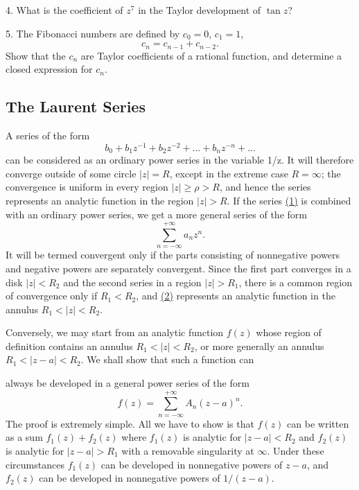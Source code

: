 4. What is the coefficient of $z^{7}$ in the Taylor development of $\tan z$?

5. The Fibonacci numbers are defined by $c_{0}=0$, $c_{1}=1$,
\begin{equation*}
c _ {n} = c _ {n - 1} + c _ {n - 2}.
\end{equation*}
Show that the $c_{n}$ are Taylor coefficients of a rational function, and determine a closed expression for $c_{n}$.

\setcounter{section}{1}\setcounter{subsection}{2}\subsection{The Laurent Series}\label{sec:5.1.3}
A series of the form
\begin{equation*}
b _ {0} + b _ {1} z ^ {- 1} + b _ {2} z ^ {- 2} + \dots + b _ {n} z ^ {- n} + \dots\tag{1}\label{eq:5.1}
\end{equation*}
can be considered as an ordinary power series in the variable 1/z. It will therefore converge outside of some circle $|z| = R$, except in the extreme case $R = \infty$; the convergence is uniform in every region $|z| \geq \rho > R$, and hence the series represents an analytic function in the region $|z| > R$. If the series \hyperref[eq:5.1]{(1)} is combined with an ordinary power series, we get a more general series of the form
\begin{equation*}
\sum_ {n = - \infty} ^ {+ \infty} a _ {n} z ^ {n}.\tag{2}\label{eq:5.2}
\end{equation*}
It will be termed convergent only if the parts consisting of nonnegative powers and negative powers are separately convergent. Since the first part converges in a disk $|z| < R_{2}$ and the second series in a region $|z| > R_{1}$, there is a common region of convergence only if $R_{1} < R_{2}$, and \hyperref[eq:5.2]{(2)} represents an analytic function in the annulus $R_{1} < |z| < R_{2}$.

Conversely, we may start from an analytic function $f(z)$ whose region of definition contains an annulus $R_{1} < |z| < R_{2}$, or more generally an annulus $R_{1} < |z - a| < R_{2}$. We shall show that such a function can


always be developed in a general power series of the form
\begin{equation*}
f (z) = \sum_ {n = - \infty} ^ {+ \infty} A _ {n} (z - a) ^ {n}.
\end{equation*}
The proof is extremely simple. All we have to show is that $f(z)$ can be written as a sum $f_{1}(z) + f_{2}(z)$ where $f_{1}(z)$ is analytic for $|z - a| < R_{2}$ and $f_{2}(z)$ is analytic for $|z - a| > R_{1}$ with a removable singularity at $\infty$. Under these circumstances $f_{1}(z)$ can be developed in nonnegative powers of $z - a$, and $f_{2}(z)$ can be developed in nonnegative powers of $1 / (z - a)$.

